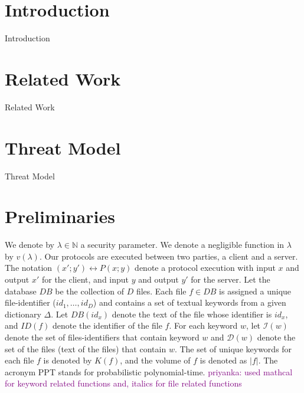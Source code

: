 \documentclass[sigconf]{acmart}
\newcommand{\priyanka}[1]{\textcolor{purple}{priyanka: #1}}
\newcommand{\DB}[1]{\mathcal{D}(#1)}
\newcommand{\vol}[1]{\lvert{#1}\rvert}
\newcommand{\In}[1]{\ensuremath{\mathcal{I}(#1)}}
\begin{document}
\fi




\section{Introduction}
Introduction

\section{Related Work}
Related Work


\section{Threat Model}
Threat Model

\section{Preliminaries}
We denote by $\lambda \in \mathds{N}$ a security parameter. We denote a negligible function in $\lambda$ by $v(\lambda)$. Our protocols are executed between two parties, a client and a server. The notation $(x';y')\leftrightarrow P(x;y)$ denote a protocol execution with input $x$ and output $x'$ for the client, and input $y$ and output $y'$ for the server. Let the database $DB$ be the collection of $D$ files. Each file $f \in DB$ is assigned a unique file-identifier ($id_1, \ldots, id_D$) and contains a set of textual keywords from a given dictionary $\Delta$.  
Let $DB(id_x)$ denote the text of the file whose identifier is $id_x$, and $ID(f)$ denote the identifier of the file $f$. For each keyword $w$, let $\In{w}$ denote the set of files-identifiers that contain keyword $w$ and $\DB{w}$ denote the set of the files (text of the files) that contain $w$. The set of unique keywords for each file $f$ is denoted by  $K(f)$, and the volume of $f$ is denoted as $\vol{f}$. The acronym PPT stands for probabilistic polynomial-time.
\priyanka{used mathcal for keyword related functions and, italics for file related functions}
\end{document}
